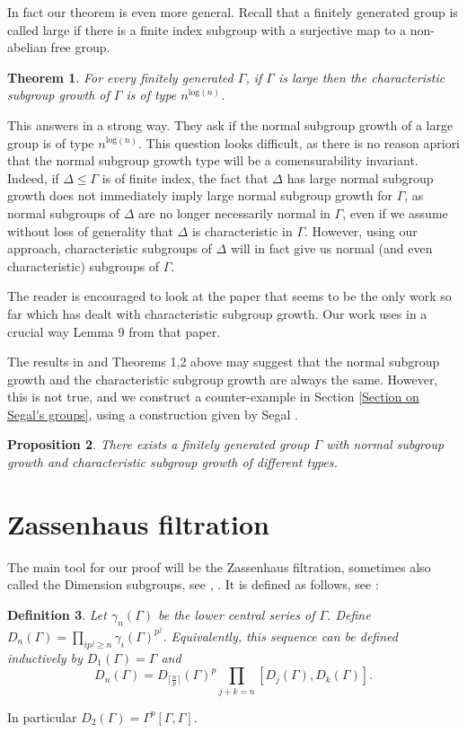 \documentclass[letterpaper]{amsart}
\newtheorem{theorem}{Theorem}[section]
\newtheorem{definition}[theorem]{Definition}
\newtheorem{proposition}[theorem]{Proposition}
\begin{document}
In fact our theorem is even more general. Recall that a finitely generated group is called large if there is a finite index subgroup with a surjective map to a non-abelian free group.
\begin{theorem}
\label{Characteristic Growth of Large Groups}
For every finitely generated $\Gamma$, if $\Gamma$ is large then the characteristic subgroup growth of $\Gamma$ is of type $n^{\mathrm{log}(n)}$.
\end{theorem}
This answers \cite[Problem 7]{barnea2020large} in a strong way. They ask if the normal subgroup growth of a large group is of type $n^{\mathrm{log}(n)}.$ This question looks difficult, as there is no reason apriori that the normal subgroup growth type will be a comensurability invariant. Indeed, if $\Delta \leq \Gamma$ is of finite index, the fact that $\Delta$ has large normal subgroup growth does not immediately imply large normal subgroup growth for $\Gamma$, as normal subgroups of $\Delta$ are no longer necessarily normal in $\Gamma$, even if we assume without loss of generality that $\Delta$ is characteristic in $\Gamma$. However, using our approach, characteristic subgroups of $\Delta$ will in fact give us normal (and even characteristic) subgroups of $\Gamma$.

The reader is encouraged to look at the paper \cite{barnea2020large} that seems to be the only work so far which has dealt with characteristic subgroup growth. Our work uses in a crucial way Lemma 9 from that paper.

The results in \cite{barnea2020large} and Theorems 1,2 above may suggest that the normal subgroup growth and the characteristic subgroup growth are always the same.
However, this is not true, and we construct a counter-example in Section \ref{Section on Segal's groups}, using a construction given by Segal \cite{segal2000finite}.
\begin{proposition}
\label{A group with larger normal subgroup growth}
There exists a finitely generated group $\Gamma$ with normal subgroup growth and characteristic subgroup growth of different types.
\end{proposition}

\section{Zassenhaus filtration}
The main tool for our proof will be the Zassenhaus filtration, sometimes also called the Dimension subgroups, see \cite[Chapters 11 and 12]{dixon2003analytic}, \cite{minavc2016dimensions}.
It is defined as follows, see \cite[Definition 11.1, Theorem 11.2]{dixon2003analytic}:
\begin{definition}
Let $\gamma_n(\Gamma)$ be the lower central series of $\Gamma$. Define $D_n(\Gamma) = \prod_{ip^j \geq n} \gamma_i(\Gamma)^{p^j}$.
Equivalently, this sequence can be defined inductively by $D_1(\Gamma) = \Gamma$ and $$D_n(\Gamma) = D_{\lceil\frac{n}{p}\rceil}(\Gamma)^p \prod_{j + k = n}[D_j(\Gamma), D_k(\Gamma)].$$
\end{definition}
In particular $D_2(\Gamma) = \Gamma^p[\Gamma, \Gamma]$.
\end{document}
